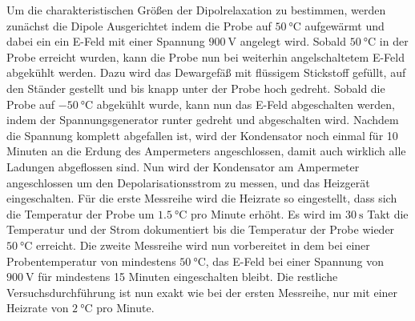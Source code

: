     Um die charakteristischen Größen der Dipolrelaxation zu bestimmen, 
    werden zunächst die Dipole Ausgerichtet indem die Probe auf $\SI{50}{\celsius}$ aufgewärmt und dabei ein ein E-Feld mit einer Spannung $\SI{900}{\volt}$ angelegt wird.
    Sobald $\SI{50}{\celsius}$ in der Probe erreicht wurden, kann die Probe nun bei weiterhin angelschaltetem E-Feld abgekühlt werden.
    Dazu wird das Dewargefäß mit flüssigem Stickstoff gefüllt, auf den Ständer gestellt und bis knapp unter der Probe hoch gedreht.
    Sobald die Probe auf $\SI{-50}{\celsius}$ abgekühlt wurde, kann nun das E-Feld abgeschalten werden, indem der Spannungsgenerator runter gedreht und abgeschalten wird.
    Nachdem die Spannung komplett abgefallen ist, wird der Kondensator noch einmal für 10 Minuten an die Erdung des Ampermeters angeschlossen, damit auch wirklich alle Ladungen abgeflossen sind.
    Nun wird der Kondensator am Ampermeter angeschlossen um den Depolarisationsstrom zu messen, und das Heizgerät eingeschalten.
    Für die erste Messreihe wird die Heizrate so eingestellt, dass sich die Temperatur der Probe um $\SI{1.5}{\celsius}$ pro Minute erhöht.
    Es wird im $\SI{30}{\second}$ Takt die Temperatur und der Strom dokumentiert bis die Temperatur der Probe wieder $\SI{50}{\celsius}$ erreicht. 
    Die zweite Messreihe wird nun vorbereitet in dem bei einer Probentemperatur von mindestens $\SI{50}{\celsius}$, das E-Feld bei einer Spannung von $\SI{900}{\volt}$ für mindestens 15 Minuten eingeschalten bleibt.
    Die restliche Versuchsdurchführung ist nun exakt wie bei der ersten Messreihe, nur mit einer Heizrate von $\SI{2}{\celsius}$ pro Minute.
